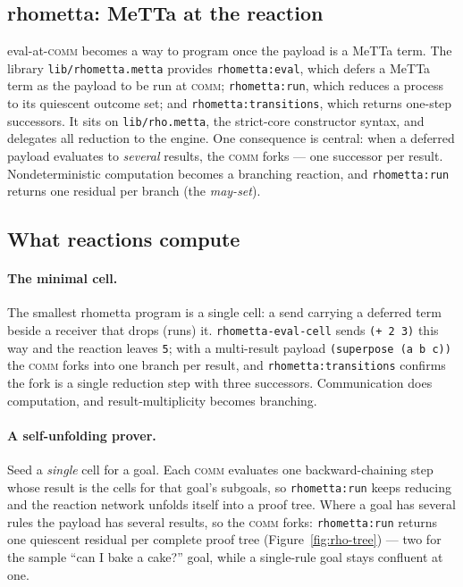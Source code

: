 \documentclass[11pt]{article}
\newcommand{\code}[1]{\texttt{#1}}
\begin{document}
\subsection{rhometta: MeTTa at the reaction}

eval-at-\textsc{comm} becomes a way to program once the payload is a MeTTa term. The library
\code{lib/rhometta.metta} provides \code{rhometta:eval}, which defers a MeTTa term as the
payload to be run at \textsc{comm}; \code{rhometta:run}, which reduces a process to its
quiescent outcome set; and \code{rhometta:transitions}, which returns one-step successors. It
sits on \code{lib/rho.metta}, the strict-core constructor syntax, and delegates all
reduction to the engine. One consequence is central: when a deferred payload evaluates to
\emph{several} results, the \textsc{comm} forks --- one successor per result. Nondeterministic
computation becomes a branching reaction, and \code{rhometta:run} returns one residual per
branch (the \emph{may-set}).

\subsection{What reactions compute}

\paragraph{The minimal cell.} The smallest rhometta program is a single cell: a send carrying
a deferred term beside a receiver that drops (runs) it. \code{rhometta-eval-cell} sends
\code{(+ 2 3)} this way and the reaction leaves \code{5}; with a multi-result payload
\code{(superpose (a b c))} the \textsc{comm} forks into one branch per result, and
\code{rhometta:transitions} confirms the fork is a single reduction step with three
successors. Communication does computation, and result-multiplicity becomes branching.

\paragraph{A self-unfolding prover.} Seed a \emph{single} cell for a goal. Each \textsc{comm}
evaluates one backward-chaining step whose result is the cells for that goal's subgoals, so
\code{rhometta:run} keeps reducing and the reaction network unfolds itself into a proof tree.
Where a goal has several rules the payload has several results, so the \textsc{comm} forks:
\code{rhometta:run} returns one quiescent residual per complete proof tree
(Figure~\ref{fig:rho-tree}) --- two for the sample ``can I bake a cake?'' goal, while a
single-rule goal stays confluent at one.
\end{document}

